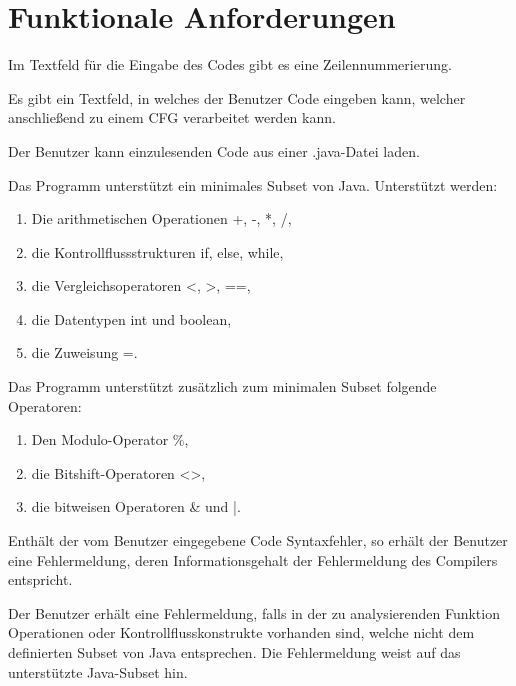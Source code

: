 
\section{Funktionale Anforderungen}

Im Textfeld für die Eingabe des Codes gibt es eine Zeilennummerierung.

Es gibt ein Textfeld, in welches der Benutzer Code eingeben kann, welcher anschließend zu einem CFG verarbeitet werden kann.

Der Benutzer kann einzulesenden Code aus einer .java-Datei laden.

Das Programm unterstützt ein minimales Subset von Java.
Unterstützt werden:
\begin{enumerate}[label=(\alph*)]
\item Die arithmetischen Operationen +, -, *, /,
\item die Kontrollflussstrukturen if, else, while,
\item die Vergleichsoperatoren <, >, ==,
\item die Datentypen int und boolean,
\item die Zuweisung =.
\end{enumerate}

Das Programm unterstützt zusätzlich zum minimalen Subset folgende Operatoren:
\begin{enumerate}[label=(\alph*)]
\item Den Modulo-Operator \%,
\item die Bitshift-Operatoren <\null>,
\item die bitweisen Operatoren \& und |.
\end{enumerate}

\newpage

Enthält der vom Benutzer eingegebene Code Syntaxfehler, so erhält der Benutzer eine Fehlermeldung, deren Informationsgehalt der Fehlermeldung des Compilers entspricht.

Der Benutzer erhält eine Fehlermeldung, falls in der zu analysierenden Funktion Operationen oder Kontrollflusskonstrukte vorhanden sind, welche nicht dem definierten Subset von Java entsprechen. Die Fehlermeldung weist auf das unterstützte Java-Subset hin.

